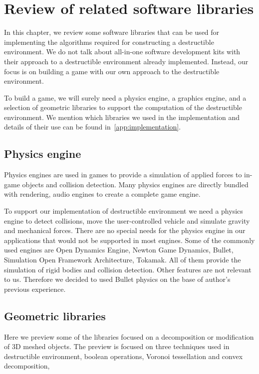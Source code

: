 \chapter{Review of related software libraries}
\label{chapt:technology}
In this chapter, we review some software libraries that can be used for implementing the algorithms required for constructing a destructible environment. We do not talk about all-in-one software development kits with their approach to a destructible environment already implemented. Instead, our focus is on building a game with our own approach to the destructible environment. 

To build a game, we will surely need a physics engine, a graphics engine, and a selection of geometric libraries to support the computation of the destructible environment. We mention which libraries we used in the implementation and details of their use can be found in~\cref{app:implementation}.

\section{Physics engine}
\label{sec:phyengine}
Physics engines are used in games to provide a simulation of applied forces to in-game objects and collision detection. Many physics engines are directly bundled with rendering, audio engines to create a complete game engine. 

To support our implementation of destructible environment we need a physics engine to detect collisions, move the user-controlled vehicle and simulate gravity and mechanical forces. There are no special needs for the physics engine in our applications that would not be supported in most engines. Some of the commonly used engines are Open Dynamics Engine, Newton Game Dynamics, Bullet, Simulation Open Framework Architecture, Tokamak. All of them provide the simulation of rigid bodies and collision detection. Other features are not relevant to us. Therefore we decided to used Bullet physics on the base of author's previous experience.

\section{Geometric libraries}
Here we preview some of the libraries focused on a decomposition or modification of 3D meshed objects. The preview is focused on three techniques used in destructible environment, boolean operations, Voronoi tessellation and convex decomposition,

